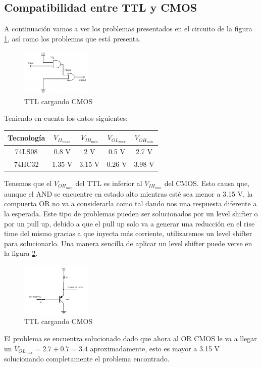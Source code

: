 \subsection{Compatibilidad entre TTL y CMOS}
A continuación vamos a ver los problemas presentados en el circuito de la figura \ref{fig:eje5_1}, así como los problemas que está presenta.

\begin{figure}[H]
	\centering
	\includegraphics[width=0.3\textwidth]{Ejercicio5/TTL_CMOS.png}
	\caption{TTL cargando CMOS}
	\label{fig:eje5_1}
\end{figure}

Teniendo en cuenta los datos siguientes:

\begin{table}[H]
	\centering
	\begin{tabular}{|c|c|c|c|c|}
		\hline
		Tecnología & $V_{IL_{max}}$	& $V_{IH_{min}}$ & $V_{OL_{max}}$ & $V_{OH_{min}}$\\
		\hline
		{74LS08} & 0.8 V & 2 V & 0.5 V & 2.7 V\\
		\hline
		{74HC32} & 1.35 V & 3.15 V & 0.26 V & 3.98 V\\
		\hline
	\end{tabular}
\end{table}

Tenemos que el $V_{OH_{min}}$ del TTL es inferior al $V_{IH_{min}}$ del CMOS. Esto causa que, aunque el AND se encuentre en estado alto mientras esté sea menor a 3.15 V, la compuerta OR no va a considerarla como tal dando nos una respuesta diferente a la esperada.
Este tipo de problemas pueden ser solucionados por un level shifter o por un pull up, debido a que el pull up solo va a generar una reducción en el rise time del mismo gracias a que inyecta más corriente, utilizaremos un level shifter para solucionarlo.
Una manera sencilla de aplicar un level shifter puede verse en la figura \ref{fig:eje5_2}.

\begin{figure}[H]
	\centering
	\includegraphics[width=0.3\textwidth]{Ejercicio5/Levelshifter.png}
	\caption{TTL cargando CMOS}
	\label{fig:eje5_2}
\end{figure}

El problema se encuentra solucionado dado que ahora al OR CMOS le va a llegar un $V_{OL_{max}}=2.7+0.7=3.4$ aproximadamente, esto es mayor a 3.15 V solucionando completamente el problema encontrado.

